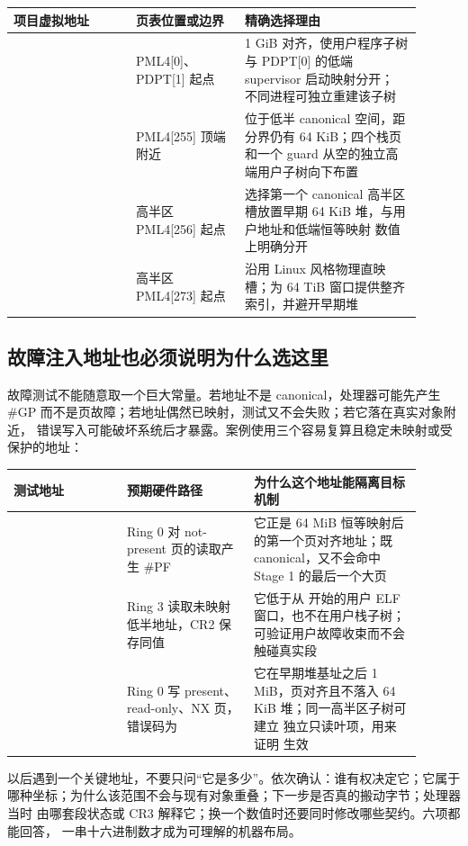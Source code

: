 \begin{longtable}{|L{0.27\linewidth}|L{0.24\linewidth}|L{0.39\linewidth}|}
\toprule
项目虚拟地址 & 页表位置或边界 & 精确选择理由 \\
\midrule
{} &
PML4[0]、PDPT[1] 起点 &
1 GiB 对齐，使用户程序子树与 PDPT[0] 的低端 supervisor 启动映射分开；
不同进程可独立重建该子树 \\\tablerowrule
{} &
PML4[255] 顶端附近 &
位于低半 canonical 空间，距分界仍有 64 KiB；四个栈页和一个 guard
从空的独立高端用户子树向下布置 \\\tablerowrule
{} &
高半区 PML4[256] 起点 &
选择第一个 canonical 高半区槽放置早期 64 KiB 堆，与用户地址和低端恒等映射
数值上明确分开 \\\tablerowrule
{} &
高半区 PML4[273] 起点 &
沿用 Linux 风格物理直映槽；为 64 TiB 窗口提供整齐索引，并避开早期堆 \\
\bottomrule
\end{longtable}

\subsection{故障注入地址也必须说明为什么选这里}

故障测试不能随意取一个巨大常量。若地址不是 canonical，处理器可能先产生
\#GP 而不是页故障；若地址偶然已映射，测试又不会失败；若它落在真实对象附近，
错误写入可能破坏系统后才暴露。案例使用三个容易复算且稳定未映射或受保护的地址：

\begin{longtable}{|L{0.25\linewidth}|L{0.28\linewidth}|L{0.37\linewidth}|}
\toprule
测试地址 & 预期硬件路径 & 为什么这个地址能隔离目标机制 \\
\midrule
{} &
Ring 0 对 not-present 页的读取产生 \#PF &
它正是 64 MiB 恒等映射后的第一个页对齐地址；既 canonical，又不会命中
Stage 1 的最后一个大页 \\\tablerowrule
{} &
Ring 3 读取未映射低半地址，CR2 保存同值 &
它低于从  开始的用户 ELF 窗口，也不在用户栈子树；
可验证用户故障收束而不会触碰真实段 \\\tablerowrule
{} &
Ring 0 写 present、read-only、NX 页，错误码为  &
它在早期堆基址之后 1 MiB，页对齐且不落入 64 KiB 堆；同一高半区子树可建立
独立只读叶项，用来证明  生效 \\
\bottomrule
\end{longtable}

\begin{rubricbox}
以后遇到一个关键地址，不要只问“它是多少”。依次确认：谁有权决定它；它属于
哪种坐标；为什么该范围不会与现有对象重叠；下一步是否真的搬动字节；处理器当时
由哪套段状态或 CR3 解释它；换一个数值时还要同时修改哪些契约。六项都能回答，
一串十六进制数才成为可理解的机器布局。
\end{rubricbox}
